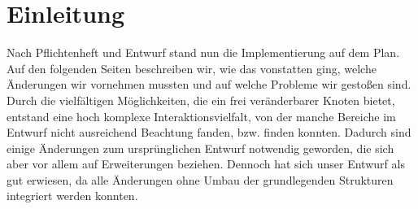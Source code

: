 \chapter{Einleitung}
Nach Pflichtenheft und Entwurf stand nun die Implementierung auf dem Plan.
Auf den folgenden Seiten beschreiben wir, wie das vonstatten ging, welche Änderungen wir vornehmen mussten und auf welche Probleme wir gestoßen sind.
Durch die vielfältigen Möglichkeiten, die ein frei veränderbarer Knoten bietet, entstand eine hoch komplexe Interaktionsvielfalt,
von der manche Bereiche im Entwurf nicht ausreichend Beachtung fanden, bzw. finden konnten.
Dadurch sind einige Änderungen zum ursprünglichen Entwurf notwendig geworden, die sich aber vor allem auf Erweiterungen beziehen.
Dennoch hat sich unser Entwurf als gut erwiesen, da alle Änderungen ohne Umbau der grundlegenden Strukturen integriert werden konnten.
